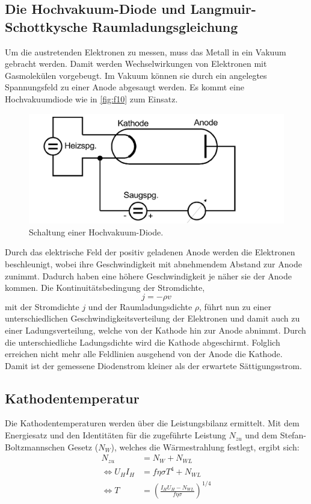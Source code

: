 \subsection{Die Hochvakuum-Diode und Langmuir-Schottkysche Raumladungsgleichung}
\label{sec:refdufotze}
Um die austretenden Elektronen zu messen, muss das Metall in ein Vakuum gebracht
werden. Damit werden Wechselwirkungen von Elektronen mit Gasmolekülen vorgebeugt. 
Im Vakuum können sie durch ein angelegtes Spannungsfeld zu einer Anode abgesaugt
werden. Es kommt eine Hochvakuumdiode wie in \autoref{fig:f10} zum Einsatz.
\begin{figure}[H]
    \centering
        \centering
        \includegraphics[width=\textwidth]{Bilder/schaltung.jpg}
        \caption{Schaltung einer Hochvakuum-Diode. \cite{anleitung4}}
    \hfill
    \label{fig:f10}
\end{figure}
\noindent Durch das elektrische Feld der positiv geladenen Anode werden die Elektronen
beschleunigt, wobei ihre Geschwindigkeit mit abnehmendem Abstand zur Anode
zunimmt. Dadurch haben eine höhere Geschwindigkeit je näher sie
der Anode kommen. Die Kontinuitätsbedingung der Stromdichte, 
\begin{equation}
j = -\rho v
\end{equation}
mit der Stromdichte $j$ und der Raumladungsdichte $\rho$, führt nun zu einer
unterschiedlichen Geschwindigkeitsverteilung der Elektronen und damit auch zu
einer Ladungsverteilung, welche von der Kathode hin zur Anode abnimmt. Durch
die unterschiedliche Ladungsdichte wird die Kathode abgeschirmt. Folglich erreichen 
nicht mehr alle Feldlinien ausgehend von der Anode die Kathode. Damit ist der
gemessene Diodenstrom kleiner als der erwartete Sättigungsstrom.

\subsection{Kathodentemperatur}
\label{sec:kattemp}
Die Kathodentemperaturen werden über die Leistungsbilanz ermittelt. Mit dem 
Energiesatz und den Identitäten für die zugeführte Leistung $N_{zu}$ und dem 
Stefan-Boltzmannschen Gesetz ($N_W$), welches die Wärmestrahlung festlegt,
ergibt sich:
\begin{align*}
                         N_{zu} &= N_W + N_{WL} \\
    \Longleftrightarrow U_H I_H &= f \eta \sigma T^4 + N_{WL} \\
    \Longleftrightarrow       T &= \left(\frac{I_H U_H - N_{WL}}{f \eta \sigma}\right)^{1/4}
\end{align*}

